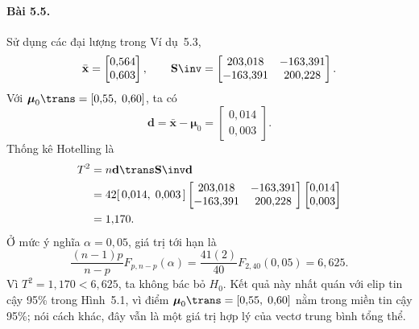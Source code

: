 \paragraph{Bài 5.5.}
Sử dụng các đại lượng trong Ví dụ~5.3,
\[
    \bar{\mathbf{x}} =
    \begin{bmatrix}
        0{,}564\\
        0{,}603
    \end{bmatrix},
    \qquad
    \mathbf{S}\inv =
    \begin{bmatrix}
        203{,}018 & -163{,}391\\
        -163{,}391 & 200{,}228
    \end{bmatrix}.
\]
Với $\boldsymbol{\mu}_0\trans=[0{,}55,\;0{,}60]$, ta có
\[
    \mathbf{d}=\bar{\mathbf{x}}-\boldsymbol{\mu}_0 =
    \begin{bmatrix}
        0{,}014\\
        0{,}003
    \end{bmatrix}.
\]
Thống kê Hotelling là
\[
\begin{aligned}
    T^2
    &= n\mathbf{d}\trans\mathbf{S}\inv\mathbf{d}\\
    &= 42[\,0{,}014,\;0{,}003\,]
    \begin{bmatrix}
        203{,}018 & -163{,}391\\
        -163{,}391 & 200{,}228
    \end{bmatrix}
    \begin{bmatrix}
        0{,}014\\
        0{,}003
    \end{bmatrix}\\
    &= 1{,}170.
\end{aligned}
\]
Ở mức ý nghĩa $\alpha=0{,}05$, giá trị tới hạn là
\[
    \frac{(n-1)p}{n-p}F_{p,n-p}(\alpha)
    = \frac{41(2)}{40}F_{2,40}(0{,}05)
    = 6{,}625.
\]
Vì $T^2=1{,}170 < 6{,}625$, ta không bác bỏ $H_0$. Kết quả này nhất quán với elip tin cậy 95\% trong Hình~5.1, vì điểm $\boldsymbol{\mu}_0\trans=[0{,}55,\;0{,}60]$ nằm trong miền tin cậy 95\%; nói cách khác, đây vẫn là một giá trị hợp lý của vectơ trung bình tổng thể.

